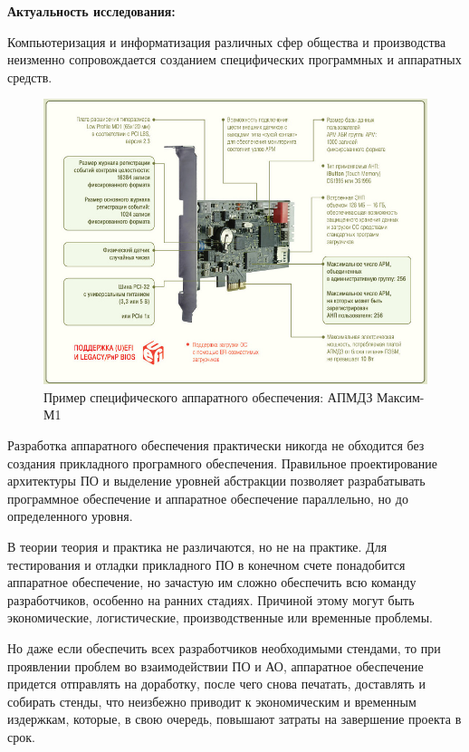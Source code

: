 \textbf{Актуальность исследования:}

Компьютеризация и информатизация различных сфер общества и производства неизменно
сопровождается созданием специфических программных и аппаратных средств.

\begin{figure}[!htbp]
    \includegraphics[width=\textwidth,height=\textheight,keepaspectratio]{images/apmdz.png}
    \caption{Пример специфического аппаратного обеспечения: АПМДЗ Максим-М1\label{fig:apmdz}}
\end{figure}

Разработка аппаратного обеспечения практически никогда не обходится без создания
прикладного програмного обеспечения.
Правильное проектирование архитектуры ПО и выделение уровней абстракции позволяет
разрабатывать программное обеспечение и аппаратное обеспечение параллельно, но
до определенного уровня.

В теории теория и практика не различаются, но не на практике.
Для тестирования и отладки прикладного ПО в конечном счете понадобится аппаратное обеспечение,
но зачастую им сложно обеспечить всю команду разработчиков, особенно на ранних стадиях.
Причиной этому могут быть экономические, логистические, производственные или временные проблемы.

Но даже если обеспечить всех разработчиков необходимыми стендами, то при проявлении
проблем во взаимодействии ПО и АО, аппаратное обеспечение придется отправлять на доработку,
после чего снова печатать, доставлять и собирать стенды, что неизбежно приводит к экономическим
и временным издержкам, которые, в свою очередь, повышают затраты на завершение проекта в срок.

